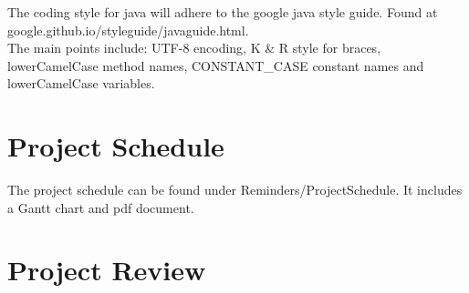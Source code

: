 \documentclass[a4paper]{article}
\begin{document}
    The coding style for java will adhere to the google java style guide. Found at google.github.io/styleguide/javaguide.html. \\

    The main points include: UTF-8 encoding, K \& R style for braces, lowerCamelCase method names, CONSTANT\_CASE constant names and lowerCamelCase variables.

\section{Project Schedule}
    \label{sec:ProjectSchedule}

    The project schedule can be found under Reminders/ProjectSchedule. It includes a Gantt chart and pdf document.

\section{Project Review}
    \label{sec:projReview}
\end{document}
